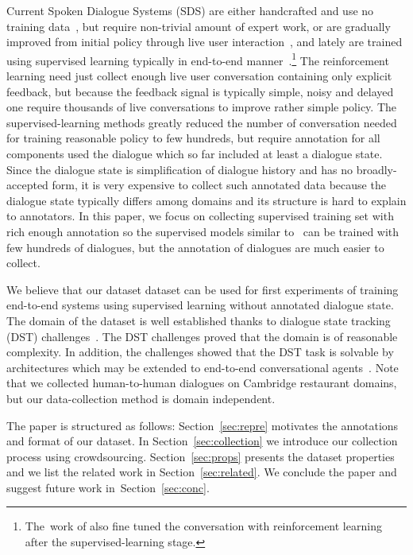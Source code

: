 \documentclass[runningheads,a4paper]{llncs}
\begin{document}
Current Spoken Dialogue Systems (SDS) are either handcrafted and use no training data~\cite{duvsek2014alex,raux2005let}, but require non-trivial amount of expert work, or are gradually improved from initial policy through live user interaction~\cite{young2010hidden,gasic2011line}, and lately are trained using supervised learning typically in end-to-end manner~\cite{wen2016network,williams2016end}.\footnote{The~work of \cite{williams2016end} also fine tuned the conversation with reinforcement learning after the supervised-learning stage.}
The reinforcement learning need just collect enough live user conversation containing only explicit feedback, but because the feedback signal is typically simple, noisy and delayed one require thousands of live conversations to improve rather simple policy.\cite{gasic2011line}
The supervised-learning methods greatly reduced the number of conversation needed for training reasonable policy to few hundreds\cite{wen2016network}, but require annotation for all components used the dialogue which so far included at least a dialogue state\cite{wen2016network,young2010hidden}.
Since the dialogue state is simplification of dialogue history and has no broadly-accepted form, it is very expensive to collect such annotated data because the dialogue state typically differs among domains and its structure is hard to explain to annotators.
In this paper, we focus on collecting supervised training set with rich enough annotation so the supervised models similar to~\cite{wen2016network} can be trained with few hundreds of dialogues, but the annotation of dialogues are much easier to collect.

We believe that our dataset dataset can be used for first experiments of training end-to-end systems using supervised learning without annotated dialogue state.
The domain of the dataset is well established thanks to dialogue state tracking (DST) challenges~\cite{williams2013dstc1,henderson2014dstc2,henderson2014dstc3}. 
The DST challenges proved that the domain is of reasonable complexity.
In addition, the challenges showed that the DST task is solvable by architectures which may be extended to end-to-end conversational agents~\cite{platek2016recurrent,vodolan2015hybrid,henderson2014word}.
Note that we collected human-to-human dialogues on Cambridge restaurant domains, but our data-collection method is domain independent.

The paper is structured as follows: Section~\ref{sec:repre} motivates the annotations and format of our dataset.
In Section~\ref{sec:collection} we introduce our collection process using crowdsourcing.
Section~\ref{sec:props} presents the dataset properties and we list the related work in Section~\ref{sec:related}.
We conclude the paper and suggest future work in~Section~\ref{sec:conc}.
\end{document}
